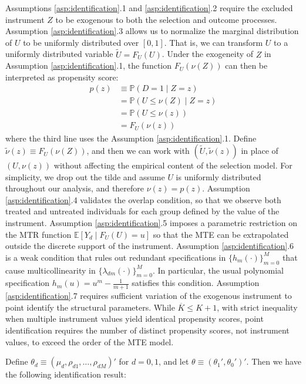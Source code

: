 \documentclass[11pt]{article}
\theoremstyle{definition}
\newcommand{\Exp}{\ensuremath{\mathbb{E}}} %
\newcommand{\Prob}{\ensuremath{\mathbb{P}}} %
\newcommand{\0}{\ensuremath{\mathbf{0}}}
\begin{document}
\begin{bibunit}
Assumptions \ref{asp:identification}.1 and \ref{asp:identification}.2 require the excluded instrument $Z$ to be exogenous to both the selection and outcome processes. Assumption \ref{asp:identification}.3 allows us to normalize the marginal distribution of $U$ to be uniformly distributed over $[0,1]$. That is, we can transform $U$ to a uniformly distributed variable $\widetilde{U} = F_{U}(U)$. Under the exogeneity of $Z$ in Assumption \ref{asp:identification}.1, the function $F_U(\nu(Z))$ can then be interpreted as propensity score:
\begin{align*}
	p(z) 	&\equiv \Prob(D=1\mid Z = z) \\
			&= \Prob(U\leq \nu(Z)\mid Z = z) \\
			&= \Prob(U\leq \nu(z)) \\ 
			&= F_U(\nu(z))
\end{align*}
where the third line uses the Assumption \ref{asp:identification}.1. Define $\widetilde{\nu}(z) \equiv F_U(\nu(Z))$, and then we can work with $(\widetilde{U}, \widetilde{\nu}(z))$ in place of $(U, \nu(z))$ without affecting the empirical content of the selection model. For simplicity, we drop out the tilde and assume $U$ is uniformly distributed throughout our analysis, and therefore $\nu(z) = p(z)$. Assumption \ref{asp:identification}.4 validates the overlap condition, so that we observe both treated and untreated individuals for each group defined by the value of the instrument. Assumption \ref{asp:identification}.5 imposes a parametric restriction on the MTR function $\Exp[Y_d\mid F_U(U)=u]$ so that the MTE can be extrapolated outside the discrete support of the instrument. Assumption \ref{asp:identification}.6 is a weak condition that rules out redundant specifications in $\{h_m(\cdot)\}_{m=0}^M$ that cause multicollinearity in $\{\lambda_{dm}(\cdot)\}_{m=0}^M$. In particular, the usual polynomial specification $h_m(u) = u^m - \frac{1}{m+1}$ satisfies this condition. Assumption \ref{asp:identification}.7 requires sufficient variation of the exogenous instrument to point identify the structural parameters.  While $\overline{K} \leq K+1$, with strict inequality when multiple instrument values yield identical propensity scores, point identification requires the number of distinct propensity scores, not instrument values, to exceed the order of the MTE model. 

Define $\theta_d \equiv (\mu_d, \rho_{d1}, \ldots, \rho_{dM})'$ for $d = 0,1$, and let $\theta \equiv (\theta_1', \theta_0')'$. Then we have the following identification result:


\end{bibunit}
\end{document}
